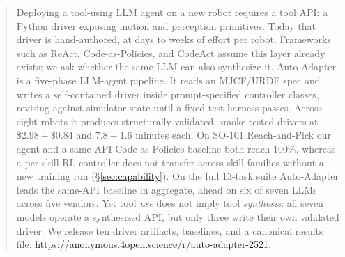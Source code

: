 \begin{abstract}
Deploying a tool-using LLM agent on a new robot requires a tool
API: a Python driver exposing motion and perception primitives.
Today that driver is hand-authored, at days to weeks of effort per
robot. Frameworks such as ReAct, Code-as-Policies, and CodeAct
assume this layer already exists; we ask whether the same LLM can
also synthesize it. Auto-Adapter is a five-phase LLM-agent pipeline. It reads an
MJCF/URDF spec and writes a self-contained driver inside
prompt-specified controller classes, revising against simulator
state until a fixed test harness passes. Across eight robots it produces
structurally validated, smoke-tested drivers at $\$2.98 \pm \$0.84$
and $7.8 \pm 1.6$ minutes each. On SO-101 Reach-and-Pick our agent
and a same-API Code-as-Policies baseline both reach 100\%, whereas a
per-skill RL controller does not transfer across skill families without a
new training run (\S\ref{sec:capability}). On the full 13-task suite Auto-Adapter leads the
same-API baseline in aggregate, ahead on six of seven LLMs across five vendors. Yet tool
\emph{use} does not imply tool \emph{synthesis}: all seven models operate a
synthesized API, but only three write their own validated driver.
We release ten driver artifacts, baselines, and a canonical results
file: \url{https://anonymous.4open.science/r/auto-adapter-2521}.
\end{abstract}
